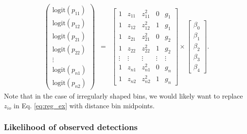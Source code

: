 \documentclass[aoas,preprint]{imsart}
\numberwithin{equation}{section}
\theoremstyle{plain}
\begin{document}
\begin{eqnarray}
  \left(
  \begin{array}{c}
    \textrm{logit}(p_{11}) \\
    \textrm{logit}(p_{12}) \\
    \textrm{logit}(p_{21}) \\
    \textrm{logit}(p_{22}) \\
    \vdots \\
    \textrm{logit}(p_{n1}) \\
    \textrm{logit}(p_{n2})
  \end{array}
  \right)
    & = &
  \left[
  \begin{array}{ccccc}
    1 & z_{11} & z_{11}^2 & 0 & g_1 \\
    1 & z_{12} & z_{12}^2 & 1 & g_1 \\
    1 & z_{21} & z_{21}^2 & 0 & g_2 \\
    1 & z_{22} & z_{22}^2 & 1 & g_2 \\
    \vdots & \vdots & \vdots & \vdots & \vdots \\
    1 & z_{n1} & z_{n1}^2 & 0 & g_n \\
    1 & z_{n2} & z_{n2}^2 & 1 & g_n
  \end{array}
  \right] \times
      \left[
  \begin{array}{c}
    \beta_0 \\
    \beta_1 \\
    \beta_2 \\
    \beta_3 \\
    \beta_4
  \end{array}
  \right].
  \label{eq:reg_ex}
\end{eqnarray}
Note that in the case of irregularly shaped bins, we would likely want to replace $z_{io}$ in Eq. \ref{eq:reg_ex} with distance bin midpoints.

\subsubsection{Likelihood of observed detections}
\end{document}
